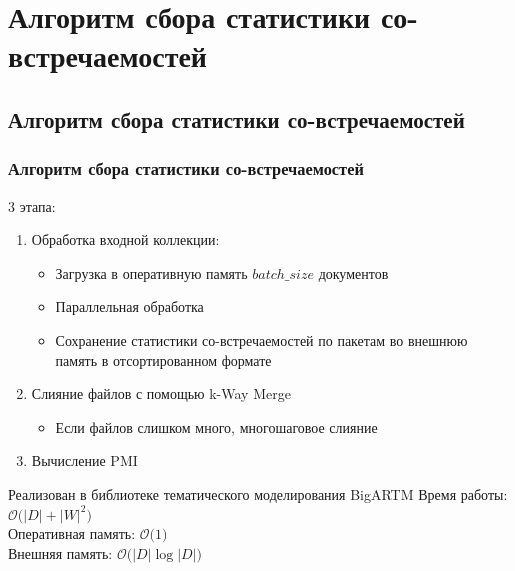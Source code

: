 \documentclass[unicode]{beamer}
\begin{document}
\section{Алгоритм сбора статистики со-встречаемостей}

\subsection{Алгоритм сбора статистики со-встречаемостей}
\begin{frame}
\frametitle{Алгоритм сбора статистики со-встречаемостей}
3 этапа:
\begin{enumerate}
    \item Обработка входной коллекции:
        \begin{itemize}
            \item Загрузка в оперативную память $batch\_size$ документов
            \item Параллельная обработка
            \item Сохранение статистики со-встречаемостей по пакетам во внешнюю память в отсортированном формате
        \end{itemize}
    \item Слияние файлов с помощью k-Way Merge
    \begin{itemize}
        \item Если файлов слишком много, многошаговое слияние
    \end{itemize}
    \item Вычисление PMI
\end{enumerate}

Реализован в библиотеке тематического моделирования BigARTM
 \newline \newline
Время работы: $\mathcal{O} \big( |D| +  |W|^2 \big)$ \\
Оперативная память: $\mathcal{O} \big( 1 \big)$ \\
Внешняя память: $\mathcal{O} \big( |D| \log |D| \big)$
\end{frame}
\end{document}
